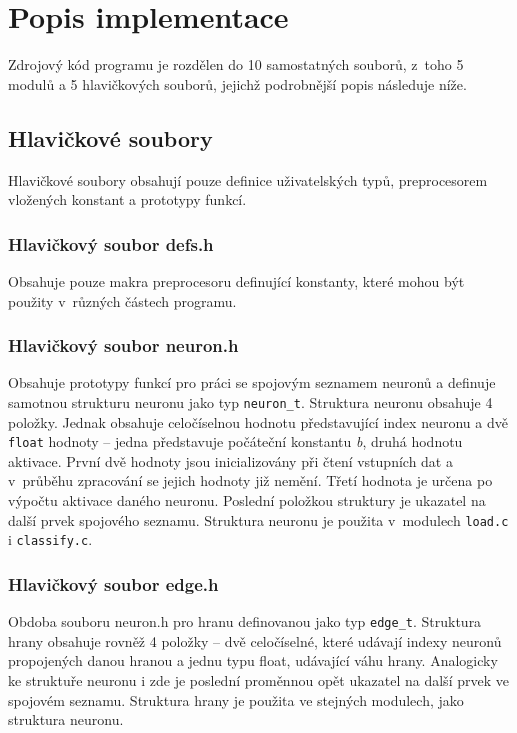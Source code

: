 \documentclass[12pt, a4paper, titlepage]{report}
\begin{document}
\newpage

\chapter{Popis implementace}
Zdrojový kód programu je rozdělen do 10 samostatných souborů, z~toho 5 modulů a 5 hlavičkových souborů, jejichž podrobnější popis následuje níže.
\section{Hlavičkové soubory}
Hlavičkové soubory obsahují pouze definice uživatelských typů, preprocesorem vložených konstant a prototypy funkcí.
\subsection{Hlavičkový soubor defs.h}
Obsahuje pouze makra preprocesoru definující konstanty, které mohou být použity v~různých částech programu. 
\subsection{Hlavičkový soubor neuron.h}
Obsahuje prototypy funkcí pro práci se spojovým seznamem neuronů a definuje samotnou strukturu neuronu jako typ \texttt{neuron\_t}. Struktura neuronu obsahuje 4 položky. Jednak obsahuje celočíselnou hodnotu představující index neuronu a dvě \texttt{float} hodnoty – jedna představuje počáteční konstantu \textit{b}, druhá hodnotu aktivace. První dvě hodnoty jsou inicializovány při čtení vstupních dat a v~průběhu zpracování se jejich hodnoty již nemění. Třetí hodnota je určena po výpočtu aktivace daného neuronu. Poslední položkou struktury je ukazatel na další prvek spojového seznamu. Struktura neuronu je použita v~modulech \texttt{load.c} i \texttt{classify.c}.
\subsection{Hlavičkový soubor edge.h}
Obdoba souboru neuron.h pro hranu definovanou jako typ \texttt{edge\_t}. Struktura hrany obsahuje rovněž 4 položky – dvě celočíselné, které udávají indexy neuronů propojených danou hranou a jednu typu float, udávající váhu hrany. Analogicky ke struktuře neuronu i zde je poslední proměnnou opět ukazatel na další prvek ve spojovém seznamu. Struktura hrany je použita ve stejných modulech, jako struktura neuronu.
\end{document}
